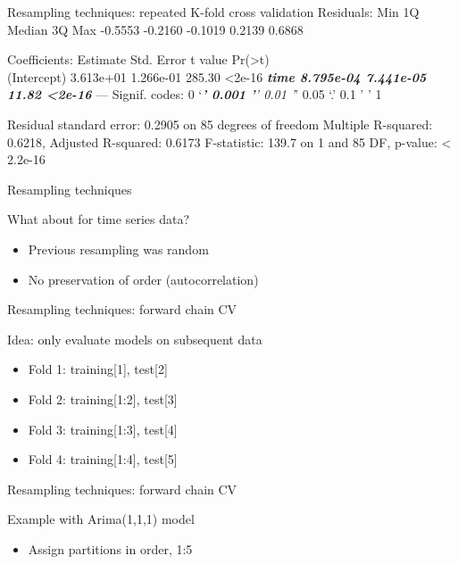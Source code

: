 \documentclass[ignorenonframetext,]{beamer}
\providecommand{\tightlist}{%
  \setlength{\itemsep}{0pt}\setlength{\parskip}{0pt}}
\begin{document}
\begin{frame}[fragile]
\begin{block}{Resampling techniques: repeated K-fold cross validation}
Residuals: Min 1Q Median 3Q Max -0.5553 -0.2160 -0.1019 0.2139 0.6868

Coefficients: Estimate Std. Error t value
Pr(\textgreater{}\textbar{}t\textbar{})\\
(Intercept) 3.613e+01 1.266e-01 285.30 \textless{}2e-16 \textbf{\emph{
time 8.795e-04 7.441e-05 11.82 \textless{}2e-16 }} --- Signif. codes: 0
`\emph{\textbf{' 0.001 '}' 0.01 '}' 0.05 `.' 0.1 ' ' 1

Residual standard error: 0.2905 on 85 degrees of freedom Multiple
R-squared: 0.6218, Adjusted R-squared: 0.6173 F-statistic: 139.7 on 1
and 85 DF, p-value: \textless{} 2.2e-16

\end{block}

\begin{block}{Resampling techniques}

What about for time series data?

\begin{itemize}
\tightlist
\item
  Previous resampling was random
\item
  No preservation of order (autocorrelation)
\end{itemize}

\end{block}

\begin{block}{Resampling techniques: forward chain CV}

Idea: only evaluate models on subsequent data

\begin{itemize}
\tightlist
\item
  Fold 1: training{[}1{]}, test{[}2{]}
\item
  Fold 2: training{[}1:2{]}, test{[}3{]}
\item
  Fold 3: training{[}1:3{]}, test{[}4{]}
\item
  Fold 4: training{[}1:4{]}, test{[}5{]}
\end{itemize}

\end{block}

\begin{block}{Resampling techniques: forward chain CV}

Example with Arima(1,1,1) model

\begin{itemize}
\tightlist
\item
  Assign partitions in order, 1:5
\end{itemize}


\end{block}
\end{frame}
\end{document}
